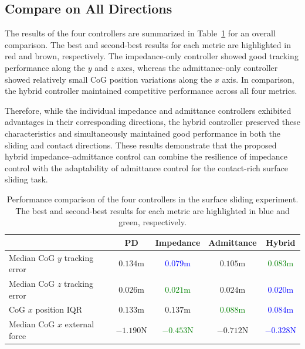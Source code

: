 \subsection{Compare on All Directions}
The results of the four controllers are summarized in Table~\ref{tb:hybrid} for an overall comparison. The best and second-best results for each metric are highlighted in red and brown, respectively. The impedance-only controller showed good tracking performance along the $y$ and $z$ axes, whereas the admittance-only controller showed relatively small CoG position variations along the $x$ axis. In comparison, the hybrid controller maintained competitive performance across all four metrics.

Therefore, while the individual impedance and admittance controllers exhibited advantages in their corresponding directions, the hybrid controller preserved these characteristics and simultaneously maintained good performance in both the sliding and contact directions. These results demonstrate that the proposed hybrid impedance--admittance control can combine the resilience of impedance control with the adaptability of admittance control for the contact-rich surface sliding task.


\begin{table}[H]
    \centering
    \caption{Performance comparison of the four controllers in the surface sliding experiment. The best and second-best results for each metric are highlighted in blue and green, respectively.}
    \label{tb:hybrid}
    \begin{tabular}{|l|c|c|c|c|}
        \hline
        & PD & Impedance & Admittance & Hybrid \\
        \hline
        Median CoG $y$ tracking error & $0.134\mathrm{m}$ & \textcolor{blue}{$0.079\mathrm{m}$} &$0.105\mathrm{m}$ & \textcolor{green}{$0.083\mathrm{m}$} \\
        \hline
        Median CoG $z$ tracking error & $0.026\mathrm{m}$ & \textcolor{green}{$0.021\mathrm{m}$} & $0.024\mathrm{m}$ & \textcolor{blue}{$0.020\mathrm{m}$} \\
        \hline
        CoG $x$ position IQR & $0.133\mathrm{m}$ & $0.137\mathrm{m}$ & \textcolor{green}{$0.088\mathrm{m}$} & \textcolor{blue}{$0.084\mathrm{m}$} \\
        \hline
        Median CoG $x$ external force & $-1.190\mathrm{N}$ & \textcolor{green}{$-0.453\mathrm{N}$} & $-0.712\mathrm{N}$ & \textcolor{blue}{$-0.328\mathrm{N}$} \\
        \hline
    \end{tabular}
\end{table}


